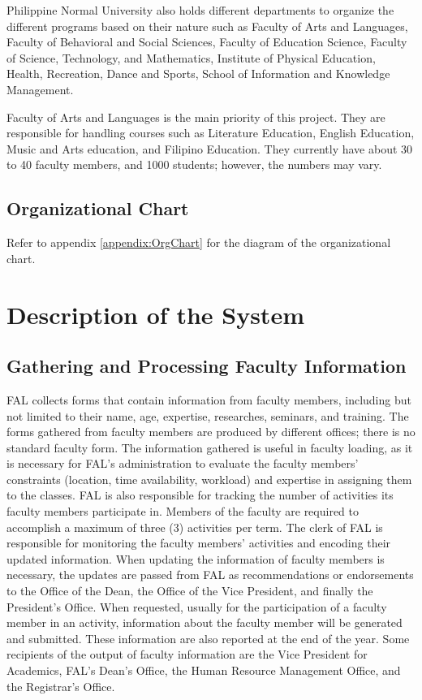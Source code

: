 Philippine Normal University also holds different departments to organize the different programs based on their nature such as Faculty of Arts and Languages, Faculty of Behavioral and Social Sciences, Faculty of Education Science, Faculty of Science, Technology, and Mathematics, Institute of Physical Education, Health, Recreation, Dance and Sports, School of Information and Knowledge Management.

Faculty of Arts and Languages is the main priority of this project. They are responsible for handling courses such as Literature Education, English Education, Music and Arts education, and Filipino Education. They currently have about 30 to 40 faculty members, and 1000 students; however, the numbers may vary.

\subsection{Organizational Chart}
Refer to appendix \ref{appendix:OrgChart} for the diagram of the organizational chart.

\section{Description of the System}

\subsection{Gathering and Processing Faculty Information}

FAL collects forms that contain information from faculty members, including but not limited to their name, age, expertise, researches, seminars, and training. The forms gathered from faculty members are produced by different offices; there is no standard faculty form. The information gathered is useful in faculty loading, as it is necessary for FAL's administration to evaluate the faculty members' constraints (location, time availability, workload) and expertise in assigning them to the classes. FAL is also responsible for tracking the number of activities its faculty members participate in. Members of the faculty are required to accomplish a maximum of three (3) activities per term. The clerk of FAL is responsible for monitoring the faculty members' activities and encoding their updated information. When updating the information of faculty members is necessary, the updates are passed from FAL as recommendations or endorsements to the Office of the Dean, the Office of the Vice President, and finally the President's Office. When requested, usually for the participation of a faculty member in an activity, information about the faculty member will be generated and submitted. These information are also reported at the end of the year. Some recipients of the output of faculty information are the Vice President for Academics, FAL's Dean's Office, the Human Resource Management Office, and the Registrar's Office.

